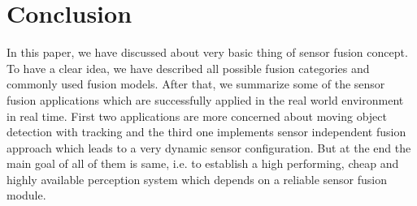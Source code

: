 \chapter{Conclusion}
In this paper, we have discussed about very basic thing of sensor fusion concept. To have a clear idea, we have described all possible fusion categories and commonly used fusion models. After that, we summarize some of the sensor fusion applications which are successfully applied in the real world environment in real time. First two applications are more concerned about moving object detection with tracking and the third one implements sensor independent fusion approach which leads to a very dynamic sensor configuration. But at the end the main goal of all of them is same, i.e. to establish a high performing, cheap and highly available perception system which depends on a reliable sensor fusion module.